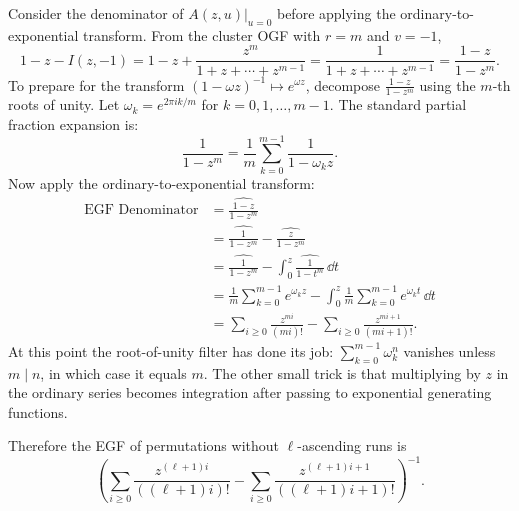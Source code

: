 Consider the denominator of $\left.A(z, u)\right|_{u = 0}$ before applying the
ordinary-to-exponential transform. From the cluster OGF with $r=m$ and $v=-1$,
\begin{equation*}
    1-z-I(z,-1)
        =1-z+\frac{z^m}{1+z+\cdots+z^{m-1}}
        =\frac{1}{1+z+\cdots+z^{m-1}}
        =\frac{1-z}{1-z^m}.
\end{equation*}
To prepare for the transform $(1-\omega z)^{-1}\mapsto e^{\omega z}$, decompose
$\frac{1-z}{1-z^m}$ using the $m$-th roots of unity. Let
$\omega_k=e^{2\pi i k/m}$ for $k=0,1,\ldots,m-1$.
The standard partial fraction expansion is:
\begin{equation*}
    \frac{1}{1-z^m}
        =\frac{1}{m}\sum_{k=0}^{m-1}\frac{1}{1-\omega_k z}.
\end{equation*}
Now apply the ordinary-to-exponential transform:
\begin{equation*}
    \begin{aligned}
        \text{EGF Denominator}
        &=\widehat{\frac{1-z}{1-z^m}} \\
        &=\widehat{\frac{1}{1-z^m}}
            -\widehat{\frac{z}{1-z^m}} \\
        &=\widehat{\frac{1}{1-z^m}}
            -\int_0^z \widehat{\frac{1}{1-t^m}}\,\dd t \\
        &=\frac{1}{m}\sum_{k=0}^{m-1}e^{\omega_k z}
            -\int_0^z\frac{1}{m}\sum_{k=0}^{m-1}e^{\omega_k t}\,\dd t \\
        &=\sum_{i\geq 0}\frac{z^{mi}}{(mi)!}
            -\sum_{i\geq 0}\frac{z^{mi+1}}{(mi+1)!}.
    \end{aligned}
\end{equation*}
At this point the root-of-unity filter has done its job:
$\sum_{k=0}^{m-1}\omega_k^n$ vanishes unless $m\mid n$, in which case it equals $m$.
The other small trick is that multiplying by $z$ in the ordinary series becomes integration
after passing to exponential generating functions.

Therefore the EGF of permutations without $\ell$-ascending runs is
\begin{equation*}
    \left(
        \sum_{i\geq 0}\frac{z^{(\ell+1)i}}{((\ell+1)i)!}
        -\sum_{i\geq 0}\frac{z^{(\ell+1)i+1}}{((\ell+1)i+1)!}
    \right)^{-1}.
\end{equation*}

